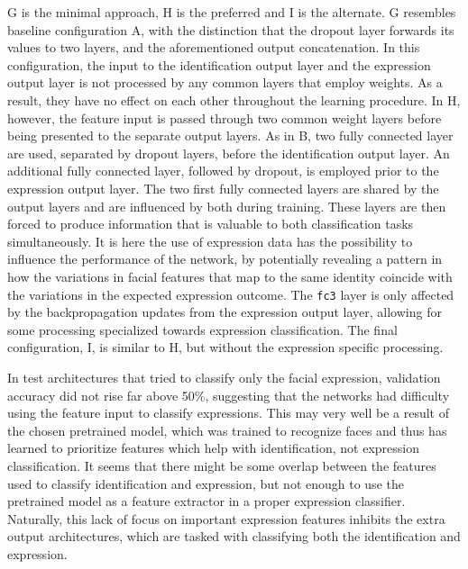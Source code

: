 \noindent G is the minimal approach, H is the preferred and I is the alternate. G resembles baseline configuration A, with the distinction that the dropout layer forwards its values to two layers, and the aforementioned output concatenation. In this configuration, the input to the identification output layer and the expression output layer is not processed by any common layers that employ weights. As a result, they have no effect on each other throughout the learning procedure. In H, however, the feature input is passed through two common weight layers before being presented to the separate output layers. As in B, two fully connected layer are used, separated by dropout layers, before the identification output layer. An additional fully connected layer, followed by dropout, is employed prior to the expression output layer. The two first fully connected layers are shared by the output layers and are influenced by both during training. These layers are then forced to produce information that is valuable to both classification tasks simultaneously. It is here the use of expression data has the possibility to influence the performance of the network, by potentially revealing a pattern in how the variations in facial features that map to the same identity coincide with the variations in the expected expression outcome. The \texttt{fc3} layer is only affected by the backpropagation updates from the expression output layer, allowing for some processing specialized towards expression classification. The final configuration, I, is similar to H, but without the expression specific processing. 


\noindent In test architectures that tried to classify only the facial expression, validation accuracy did not rise far above 50\%, suggesting that the networks had difficulty using the feature input to classify expressions. This may very well be a result of the chosen pretrained model, which was trained to recognize faces and thus has learned to prioritize features which help with identification, not expression classification. It seems that there might be some overlap between the features used to classify identification and expression, but not enough to use the pretrained model as a feature extractor in a proper expression classifier. Naturally, this lack of focus on important expression features inhibits the extra output architectures, which are tasked with classifying both the identification and expression.

